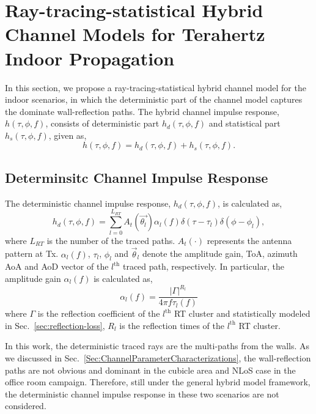 \documentclass[journal,12pt,draftclsnofoot,onecolumn]{IEEEtran}
\begin{document}
\section{Ray-tracing-statistical Hybrid Channel Models for Terahertz Indoor Propagation}
\label{Sec:ChannelModel}
 \par In this section, we propose a ray-tracing-statistical hybrid channel model for the indoor scenarios, in which the deterministic part of the channel model captures the dominate wall-reflection paths. 
 The hybrid channel impulse response, $h(\tau,\phi,f)$, consists of deterministic part $h_d(\tau,\phi,f)$ and statistical part $h_s(\tau,\phi,f)$, given as,
     \begin{equation}
    \label{eq:CIR}
    h(\tau,\phi,f)=h_d(\tau,\phi,f)+h_s(\tau,\phi,f).
    \end{equation}  
 \subsection{Determinsitc Channel Impulse Response}
 
 The deterministic channel impulse response, $h_d(\tau,\phi,f)$, is calculated as,
    \begin{equation}
    \label{eq:RT_CIR}
    h_d(\tau,\phi,f)=\sum^{L_{RT}}_{l=0}A_t(\vec{\theta_l})\alpha_{l}(f)\delta(\tau-\tau_{l})\delta(\phi-\phi_{l}),
    \end{equation}  
where $L_{RT}$ is the number of the traced paths. $A_t(\cdot)$ represents the antenna pattern at Tx. $\alpha_{l}(f)$, $\tau_{l}$, $\phi_{l}$ and $\vec{\theta}_{l}$ denote the amplitude gain, ToA, azimuth AoA and AoD vector of the $l^{\text{th}}$ traced path, respectively. In particular, the amplitude gain $\alpha_{l}(f)$ is calculated as,
    \begin{equation}
    \alpha_{l}(f)=\frac{|\Gamma|^{R_l}}{4\pi f\tau_{l}{(f)}}
    \end{equation}
    where $\Gamma$ is the reflection coefficient of the $l^{\mathrm{th}}$ RT cluster and statistically modeled in Sec.~\ref{sec:reflection-loss}, $R_l$ is the reflection times of the $l^{\mathrm{th}}$ RT cluster. 
  
  In this work, the deterministic traced rays are the multi-paths from the walls. As we discussed in Sec.~\ref{Sec:ChannelParameterCharacterizations}, the wall-reflection paths are not obvious and dominant in the cubicle area and NLoS case in the office room campaign. Therefore, still under the general hybrid model framework, the deterministic channel impulse response in these two scenarios are not considered.
\end{document}
